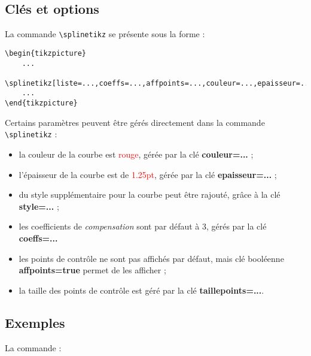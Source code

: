 \documentclass{article}
\newcommand\Cle[1]{{\bfseries\sffamily\textlangle #1\textrangle}}
\begin{document}
\subsection{Clés et options}

La commande \verb|\splinetikz| se présente sous la forme :

\begin{verbatim}
\begin{tikzpicture}
	...
	\splinetikz[liste=...,coeffs=...,affpoints=...,couleur=...,epaisseur=...,taillepoints=...,couleurpoints=...,style=...]
	...
\end{tikzpicture}
\end{verbatim}

Certains paramètres peuvent être gérés directement dans la commande \verb|\splinetikz| :

\begin{itemize}
	\item la couleur de la courbe est \textcolor{red}{rouge}, gérée par la \textsf{clé} \Cle{couleur=...} ;
	\item l'épaisseur de la courbe est de \textcolor{red}{1.25pt}, gérée par la \textsf{clé} \Cle{epaisseur=...} ;
	\item du style supplémentaire pour la courbe peut être rajouté, grâce à la \textsf{clé} \Cle{style=...} ;
	\item les coefficients de \textit{compensation} sont par défaut à 3, gérés par la \textsf{clé} \Cle{coeffs=...}
	\item les points de contrôle ne sont pas affichés par défaut, mais \textsf{clé booléenne} \Cle{affpoints=true} permet de les afficher ;
	\item la taille des points de contrôle est géré par la \textsf{clé} \Cle{taillepoints=...}.
\end{itemize}

\newpage

\subsection{Exemples}

La commande :
\end{document}
